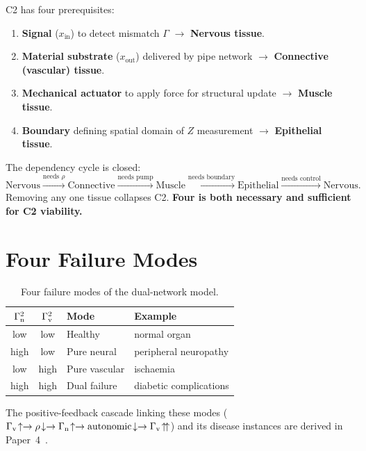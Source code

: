 \documentclass[aps,pre,twocolumn,superscriptaddress,floatfix]{revtex4-2}
\begin{document}
C2 has four prerequisites:
\begin{enumerate}
  \item \textbf{Signal} ($x_{\text{in}}$) to detect
    mismatch $\Gamma$ $\to$ \textbf{Nervous tissue}.
  \item \textbf{Material substrate} ($x_{\text{out}}$)
    delivered by pipe network $\to$
    \textbf{Connective (vascular) tissue}.
  \item \textbf{Mechanical actuator} to apply force
    for structural update $\to$ \textbf{Muscle tissue}.
  \item \textbf{Boundary} defining spatial domain of $Z$
    measurement $\to$ \textbf{Epithelial tissue}.
\end{enumerate}
The dependency cycle is closed:
\[
  \text{Nervous} \xrightarrow{\text{needs }\rho}
  \text{Connective} \xrightarrow{\text{needs pump}}
  \text{Muscle} \xrightarrow{\text{needs boundary}}
  \text{Epithelial} \xrightarrow{\text{needs control}}
  \text{Nervous}.
\]
Removing any one tissue collapses C2.
\textbf{Four is both necessary and sufficient for C2
viability.}


\section{Four Failure Modes}
\label{sec:failure-modes}

\begin{table}[H]
\caption{Four failure modes of the dual-network model.}
\label{tab:failure}
\begin{ruledtabular}
\begin{tabular}{ccll}
$\Gamma_{\text{n}}^2$ & $\Gamma_{\text{v}}^2$ & \textbf{Mode} & \textbf{Example} \\
\hline
low  & low  & Healthy       & normal organ \\
high & low  & Pure neural   & peripheral neuropathy \\
low  & high & Pure vascular & ischaemia \\
high & high & Dual failure  & diabetic complications \\
\end{tabular}
\end{ruledtabular}
\end{table}

\noindent
The positive-feedback cascade linking these modes
($\Gamma_{\text{v}}\!\uparrow \to \rho\!\downarrow \to
\Gamma_{\text{n}}\!\uparrow \to \text{autonomic}\!\downarrow
\to \Gamma_{\text{v}}\!\uparrow\!\uparrow$)
and its disease instances are derived in
Paper~4~\cite{Paper4}.
\end{document}
